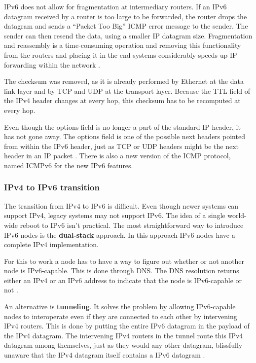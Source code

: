 \documentclass[12pt, oneside]{book}
\begin{document}
IPv6 does not allow for fragmentation at intermediary routers.
If an IPv6 datagram received by a router is too large to be forwarded, the router drops the datagram and sends a ``Packet Too Big'' ICMP error message to the sender.
The sender can then resend the data, using a smaller IP datagram size.
Fragmentation and reassembly is a time-consuming operation and removing this functionality from the routers and placing it in the end systems considerably speeds up IP forwarding within the network \cite[p.~358]{computer-networking-kurose-2012}.

The checksum was removed, as it is already performed by Ethernet at the data link layer and by TCP and UDP at the transport layer.
Because the TTL field of the IPv4 header changes at every hop, this checksum has to be recomputed at every hop.

Even though the options field is no longer a part of the standard IP header, it has not gone away.
The options field is one of the possible next headers pointed from within the IPv6 header, just as TCP or UDP headers might be the next header in an IP packet \cite[p.~359]{computer-networking-kurose-2012}.
There is also a new version of the ICMP protocol, named ICMPv6 for the new IPv6 features.

\subsubsection{IPv4 to IPv6 transition}

The transition from IPv4 to IPv6 is difficult. Even though newer systems can support IPv4, legacy systems may not support IPv6. The idea of a single world-wide reboot to IPv6 isn't practical. The most straightforward way to introduce IPv6 nodes is the \textbf{dual-stack} approach. In this approach IPv6 nodes have a complete IPv4 implementation.

For this to work a node has to have a way to figure out whether or not another node is IPv6-capable. This is done through DNS. The DNS resolution returns either an IPv4 or an IPv6 address to indicate that the node is IPv6-capable or not \cite[p.~360]{computer-networking-kurose-2012}.

An alternative is \textbf{tunneling}. It solves the problem by allowing IPv6-capable nodes to interoperate even if they are connected to each other by intervening IPv4 routers. This is done by putting the entire IPv6 datagram in the payload of the IPv4 datagram. The intervening IPv4 routers in the tunnel route this IPv4 datagram among themselves, just as they would any other datagram, blissfully unaware that the IPv4 datagram itself contains a IPv6 datagram \cite[p.~360]{computer-networking-kurose-2012}.
\end{document}
